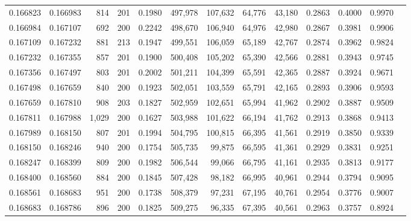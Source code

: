 \begin{tabular}{rrrrrrrrrrrrr}
0.166823 & 0.166983 &   814 & 201 &                                     0.1980 & 497,978 & 107,632 &  64,776 &  43,180 & 0.2863 & 0.4000 & 0.9970 \\
0.166984 & 0.167107 &   692 & 200 &                                     0.2242 & 498,670 & 106,940 &  64,976 &  42,980 & 0.2867 & 0.3981 & 0.9906 \\
0.167109 & 0.167232 &   881 & 213 &                                     0.1947 & 499,551 & 106,059 &  65,189 &  42,767 & 0.2874 & 0.3962 & 0.9824 \\
0.167232 & 0.167355 &   857 & 201 &                                     0.1900 & 500,408 & 105,202 &  65,390 &  42,566 & 0.2881 & 0.3943 & 0.9745 \\
0.167356 & 0.167497 &   803 & 201 &                                     0.2002 & 501,211 & 104,399 &  65,591 &  42,365 & 0.2887 & 0.3924 & 0.9671 \\
0.167498 & 0.167659 &   840 & 200 &                                     0.1923 & 502,051 & 103,559 &  65,791 &  42,165 & 0.2893 & 0.3906 & 0.9593 \\
0.167659 & 0.167810 &   908 & 203 &                                     0.1827 & 502,959 & 102,651 &  65,994 &  41,962 & 0.2902 & 0.3887 & 0.9509 \\
0.167811 & 0.167988 & 1,029 & 200 &                                     0.1627 & 503,988 & 101,622 &  66,194 &  41,762 & 0.2913 & 0.3868 & 0.9413 \\
0.167989 & 0.168150 &   807 & 201 &                                     0.1994 & 504,795 & 100,815 &  66,395 &  41,561 & 0.2919 & 0.3850 & 0.9339 \\
0.168150 & 0.168246 &   940 & 200 &                                     0.1754 & 505,735 &  99,875 &  66,595 &  41,361 & 0.2929 & 0.3831 & 0.9251 \\
0.168247 & 0.168399 &   809 & 200 &                                     0.1982 & 506,544 &  99,066 &  66,795 &  41,161 & 0.2935 & 0.3813 & 0.9177 \\
0.168400 & 0.168560 &   884 & 200 &                                     0.1845 & 507,428 &  98,182 &  66,995 &  40,961 & 0.2944 & 0.3794 & 0.9095 \\
0.168561 & 0.168683 &   951 & 200 &                                     0.1738 & 508,379 &  97,231 &  67,195 &  40,761 & 0.2954 & 0.3776 & 0.9007 \\
0.168683 & 0.168786 &   896 & 200 &                                     0.1825 & 509,275 &  96,335 &  67,395 &  40,561 & 0.2963 & 0.3757 & 0.8924 \\

\end{tabular}
